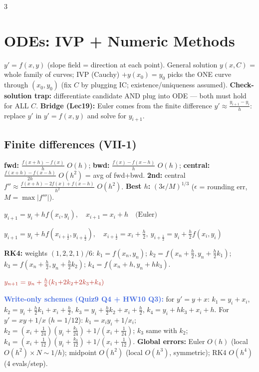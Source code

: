 \documentclass[9pt]{extarticle}
\newcommand{\hl}[1]{\textbf{\textcolor{BrickRed}{#1}}}
\newcommand{\wk}[1]{\textbf{\textcolor{OliveGreen}{#1}}}
\newcommand{\ex}[1]{\textbf{\textcolor{RoyalBlue}{#1}}}
\begin{document}
\begin{multicols}{3}
\section{ODEs: IVP + Numeric Methods}
\begin{sloppypar}\raggedright
$y'=f(x,y)$ (slope field = direction at each point). General solution $y(x,C)$ = whole family of curves; IVP (Cauchy) $+y(x_0)=y_0$ picks the ONE curve through $(x_0,y_0)$ (fix $C$ by plugging IC; existence/uniqueness assumed).
\hl{Check-solution trap:} differentiate candidate AND plug into ODE — both must hold for ALL $C$.
\wk{Bridge (Lec19):} Euler comes from the finite difference $y'\approx\tfrac{y_{i+1}-y_i}{h}$: replace $y'$ in $y'=f(x,y)$ and solve for $y_{i+1}$.

\subsection{Finite differences (VII-1)}
\textbf{fwd:} $\tfrac{f(x+h)-f(x)}h$ $O(h)$; \textbf{bwd:} $\tfrac{f(x)-f(x-h)}h$ $O(h)$; \textbf{central:} $\tfrac{f(x+h)-f(x-h)}{2h}$ $O(h^2)$ = avg of fwd+bwd. \textbf{2nd:} central $f''\approx\tfrac{f(x+h)-2f(x)+f(x-h)}{h^2}$ $O(h^2)$. \textbf{Best $h$:} $(3\epsilon/M)^{1/3}$ ($\epsilon$ = rounding err, $M=\max|f'''|$).
\begin{kbox}
\centering
$\displaystyle y_{i+1}=y_i+hf(x_i,y_i),\quad x_{i+1}=x_i+h\quad\text{(Euler)}$
\end{kbox}
\begin{kbox}
\centering
$\displaystyle y_{i+1}=y_i+hf(x_{i+\frac12},y_{i+\frac12}),\quad x_{i+\frac12}=x_i+\tfrac h2,\ y_{i+\frac12}=y_i+\tfrac h2f(x_i,y_i)$
\end{kbox}
\textbf{RK4:} weights $(1,2,2,1)/6$: $k_1=f(x_n,y_n)$; $k_2=f(x_n{+}\tfrac h2,y_n{+}\tfrac h2k_1)$; $k_3=f(x_n{+}\tfrac h2,y_n{+}\tfrac h2k_2)$; $k_4=f(x_n{+}h,y_n{+}hk_3)$.
\begin{kbox}
\centering
$\displaystyle \textcolor{BrickRed}{y_{n+1}=y_n+\tfrac h6(k_1{+}2k_2{+}2k_3{+}k_4)}$
\end{kbox}
\ex{Write-only schemes (Quiz9 Q4 + HW10 Q3):} for $y'=y+x$: $k_1=y_i{+}x_i$, $k_2=y_i{+}\tfrac h2k_1{+}x_i{+}\tfrac h2$, $k_3=y_i{+}\tfrac h2k_2{+}x_i{+}\tfrac h2$, $k_4=y_i{+}hk_3{+}x_i{+}h$. For $y'=xy+1/x$ ($h{=}1/12$): $k_1=x_iy_i+1/x_i$; $k_2=(x_i{+}\tfrac1{24})(y_i{+}\tfrac{k_1}{24})+1/(x_i{+}\tfrac1{24})$; $k_3$ same with $k_2$; $k_4=(x_i{+}\tfrac1{12})(y_i{+}\tfrac{k_3}{12})+1/(x_i{+}\tfrac1{12})$.
\textbf{Global errors:} Euler $O(h)$ (local $O(h^2)\times N\sim1/h$); midpoint $O(h^2)$ (local $O(h^3)$, symmetric); RK4 $O(h^4)$ (4 evals/step).
\end{sloppypar}


\end{multicols}
\end{document}
